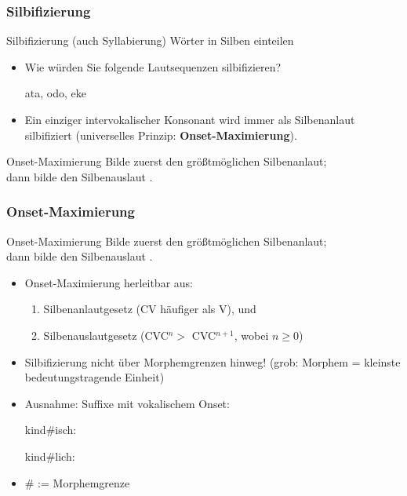 \begin{frame}
\frametitle{Silbifizierung}

\begin{block}{Silbifizierung (auch Syllabierung)}
	Wörter in Silben einteilen
\end{block}

\begin{itemize}
	\item Wie würden Sie folgende Lautsequenzen silbifizieren?
	
	\ea ata, odo, eke
	\z
	
	\pause
	
	\item Ein einziger intervokalischer Konsonant wird immer als Silbenanlaut silbifiziert (universelles Prinzip: \textbf{Onset-Maximierung}).


\end{itemize}

\begin{block}{Onset-Maximierung}
Bilde zuerst den größtmöglichen Silbenanlaut;\\
dann bilde den Silbenauslaut \citep[218]{Hall00a}.
\end{block}

\end{frame}


\begin{frame}
\frametitle{Onset-Maximierung}

\begin{block}{Onset-Maximierung}
Bilde zuerst den größtmöglichen Silbenanlaut;\\
dann bilde den Silbenauslaut \citep[218]{Hall00a}.
\end{block}


\begin{itemize}
\item Onset-Maximierung herleitbar aus:
\begin{enumerate}
\item Silbenanlautgesetz (CV häufiger als V), und
\item Silbenauslautgesetz (CVC$^{n} >$ CVC$^{n+1}$, wobei $n \geq 0$)
\end{enumerate}

\pause
\item Silbifizierung nicht über Morphemgrenzen hinweg! (grob: Morphem = kleinste bedeutungstragende Einheit)
\item Ausnahme: Suffixe mit vokalischem Onset:

\ea
kind\#isch: 

\ex
kind\#lich: \textipa{[kInt.lI\c{c}]}
\z

\item \# := Morphemgrenze



\end{itemize}

\end{frame}


